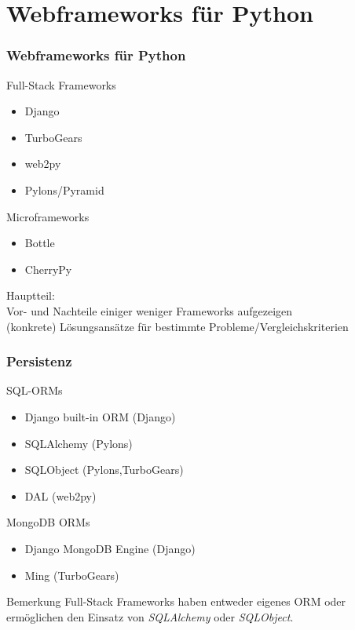 \documentclass[
    t,
    smaller,
    compress,
]{beamer}
\begin{document}
\section{Webframeworks für Python}
\begin{frame}
  \frametitle{Webframeworks für Python}
  	 Full-Stack Frameworks
  		\begin{itemize}
  			\item Django
  			\item TurboGears 
  			\item web2py
  			\item Pylons/Pyramid
  		\end{itemize}
  		 Microframeworks
  		\begin{itemize}
  			\item Bottle
  			\item CherryPy
  		\end{itemize}
  
\end{frame}


\begin{frame}
Hauptteil:\\
Vor- und Nachteile einiger weniger Frameworks aufgezeigen\\
(konkrete) Lösungsansätze für bestimmte Probleme/Vergleichskriterien
\end{frame}


\begin{frame}
  \frametitle{Persistenz}
 
    SQL-ORMs
    \begin{itemize}[<1->]
        \item Django built-in ORM (Django)
        \item SQLAlchemy (Pylons) %
        \item SQLObject (Pylons,TurboGears)
        \item DAL (web2py)
     \end{itemize}
     MongoDB ORMs
    \begin{itemize}[<1->]
        \item Django MongoDB Engine (Django)
        \item Ming (TurboGears)
    \end{itemize}
 
  \begin{block}{Bemerkung}
     Full-Stack Frameworks haben entweder eigenes ORM 	oder ermöglichen den Einsatz von \textit{SQLAlchemy} oder \textit{SQLObject}.
  \end{block}

\end{frame}
\end{document}
